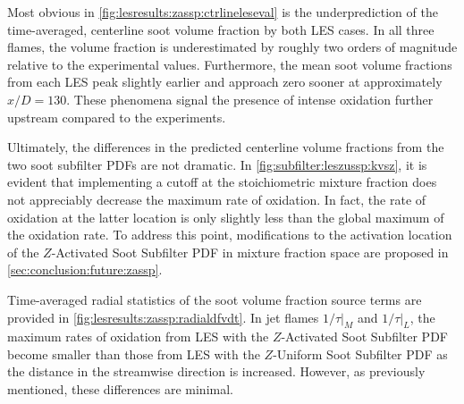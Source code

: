 Most obvious in \cref{fig:lesresults:zassp:ctrlineleseval} is the underprediction of the time-averaged, centerline soot volume fraction by both LES cases. In all three flames, the volume fraction is underestimated by roughly two orders of magnitude relative to the experimental values. Furthermore, the mean soot volume fractions from each LES peak slightly earlier and approach zero sooner at approximately $x/D = 130$. These phenomena signal the presence of intense oxidation further upstream compared to the experiments.


Ultimately, the differences in the predicted centerline volume fractions from the two soot subfilter PDFs are not dramatic. In \cref{fig:subfilter:leszussp:kvsz}, it is evident that implementing a cutoff at the stoichiometric mixture fraction does not appreciably decrease the maximum rate of oxidation. In fact, the rate of oxidation at the latter location is only slightly less than the global maximum of the oxidation rate. To address this point, modifications to the activation location of the $Z$-Activated Soot Subfilter PDF in mixture fraction space are proposed in \cref{sec:conclusion:future:zassp}.

Time-averaged radial statistics of the soot volume fraction source terms are provided in \cref{fig:lesresults:zassp:radialdfvdt}. In jet flames $1/\tau|_M$ and $1/\tau|_L$, the maximum rates of oxidation from LES with the $Z$-Activated Soot Subfilter PDF become smaller than those from LES with the $Z$-Uniform Soot Subfilter PDF as the distance in the streamwise direction is increased. However, as previously mentioned, these differences are minimal. %

